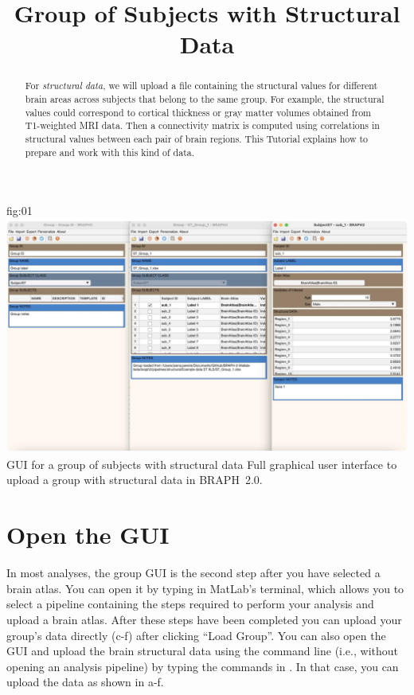 \documentclass[justified]{tufte-handout}
\title{Group of Subjects with Structural Data}
\begin{document}
\maketitle

\begin{abstract}
\noindent
For \emph{structural data}, we will upload a file containing the structural values for different brain areas across subjects that belong to the same group. For example, the structural values could correspond to cortical thickness or gray matter volumes obtained from T1-weighted MRI data. Then a connectivity matrix is computed using correlations in structural values between each pair of brain regions. This Tutorial explains how to prepare and work with this kind of data.
\end{abstract}

\tableofcontents

	{fig:01}
	{\includegraphics{fig01.jpg}}
	{GUI for a group of subjects with structural data}
	{
	Full graphical user interface to upload a group with structural data in BRAPH~2.0. 
	}

\clearpage
\section{Open the GUI}

In most analyses, the group GUI is the second step after you have selected a brain atlas. You can open it by typing  in MatLab's terminal, which allows you to select a pipeline containing the steps required to perform your analysis and upload a brain atlas. After these steps have been completed you can upload your group's data directly (c-f) after clicking ``Load Group''. You can also open the GUI and upload the brain structural data using the command line (i.e., without opening an analysis pipeline) by typing the commands in . In that case, you can upload the data as shown in a-f.
\end{document}
